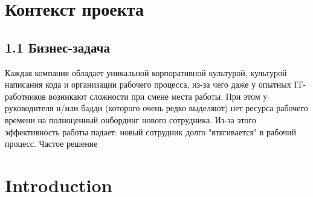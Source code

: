 \documentclass[a4paper, 12pt]{article}
\begin{document}
\maketitle 
\section{Контекст проекта}
\subsection*{1.1 Бизнес-задача}
Каждая компания обладает уникальной корпоративной культурой, культурой написания кода и организации рабочего процесса, из-за чего даже у опытных IT-работников возникают сложности при смене места работы. При этом у руководителя и/или бадди (которого очень редко выделяют) нет ресурса рабочего времени на полноценный онбординг нового сотрудника. Из-за этого эффективность работы падает: новый сотрудник долго "втягивается" в рабочий процесс. Частое решение 
\section{Introduction}
\end{document}

